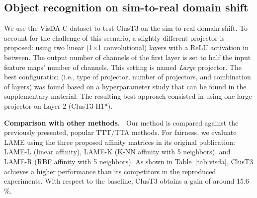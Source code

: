\documentclass{article}
\newcommand{\mypar}[1]{\vspace{3pt}\noindent\textbf{#1~}}
\newcommand{\ppm}{\,\scriptsize$\pm$}
\newcommand{\dorowcolors}{\rowcolors{2}{gray!15}{white}}
\begin{document}

\subsection{Object recognition on sim-to-real domain shift}

We use the VisDA-C dataset to test ClusT3 on the sim-to-real domain shift. To account for the challenge of this scenario, a slightly different projector is proposed: using two linear (1$\times$1 convolutional) layers with a ReLU activation in between. The output number of channels of the first layer is set to half the input feature maps' number of channels. This setting is named \emph{Large} projector. 
The best configuration (i.e., type of projector, number of projectors, and combination of layers) was found based on a hyperparameter study that can be found in the supplementary material. The resulting best approach consisted in using one large projector on Layer 2 (ClusT3-H1*).

\mypar{Comparison with other methods.} Our method is compared against the previously presented, popular TTT/TTA methods. For fairness, we evaluate LAME \cite{lame2022} using the three proposed affinity matrices in its original publication: LAME-L (linear affinity), LAME-K (K-NN affinity with 5 neighbors), and LAME-R (RBF affinity with 5 neighbors). As shown in Table~\ref{tab:visda}, ClusT3 achieves a higher performance than its competitors in the reproduced experiments. With respect to the baseline, ClusT3 obtains a gain of around 15.6$\%$. 
\end{document}
